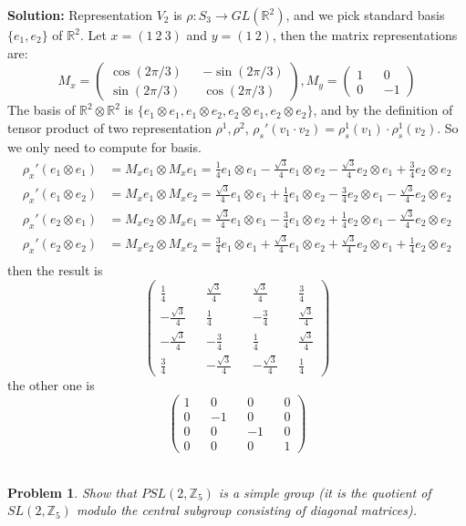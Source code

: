 \documentclass[12pt]{article}
\newtheorem{problem}{Problem}
\begin{document}
\textbf{Solution:} Representation $V_2$ is $\rho:S_3\to GL(\mathbb{R}^2)$, and we pick standard basis $\{e_1, e_2\}$ of $\mathbb{R}^2$. Let $x=(1\ 2\ 3)$ and $y=(1\ 2)$, then the matrix representations are:
$$
M_x=\begin{pmatrix}
\cos(2\pi/3) && -\sin(2\pi/3) \\ \sin(2\pi/3) && \cos(2\pi/3)
\end{pmatrix}, M_y=
\begin{pmatrix}
1 && 0 \\
0 && -1
\end{pmatrix}
$$
The basis of $\mathbb{R}^2\otimes\mathbb{R}^2$ is $\{e_1\otimes e_1, e_1\otimes e_2, e_2\otimes e_1, e_2\otimes e_2\}$, and by the definition of tensor product of two representation $\rho^1,\rho^2$, $\rho_s'(v_1\cdot v_2)=\rho^1_s(v_1)\cdot\rho^1_s(v_2)$. So we only need to compute for basis.
$$
\begin{aligned}
\rho_x'(e_1\otimes e_1)&=M_xe_1\otimes M_xe_1= \frac{1}{4}e_1\otimes e_1-\frac{\sqrt{3}}{4}e_1\otimes e_2-\frac{\sqrt{3}}{4}e_2\otimes e_1+\frac{3}{4}e_2\otimes e_2\\
\rho_x'(e_1\otimes e_2)&=M_xe_1\otimes M_xe_2=\frac{\sqrt{3}}{4}e_1\otimes e_1+\frac{1}{4}e_1\otimes e_2-\frac{3}{4}e_2\otimes e_1-\frac{\sqrt{3}}{4}e_2\otimes e_2 \\
\rho_x'(e_2\otimes e_1)&=M_xe_2\otimes M_xe_1=\frac{\sqrt{3}}{4}e_1\otimes e_1-\frac{3}{4}e_1\otimes e_2+\frac{1}{4}e_2\otimes e_1-\frac{\sqrt{3}}{4}e_2\otimes e_2 \\
\rho_x'(e_2\otimes e_2)&=M_xe_2\otimes M_xe_2= \frac{3}{4}e_1\otimes e_1+\frac{\sqrt{3}}{4}e_1\otimes e_2+\frac{\sqrt{3}}{4}e_2\otimes e_1+\frac{1}{4}e_2\otimes e_2\\
\end{aligned}
$$
then the result is 
$$
\begin{pmatrix}
\frac{1}{4} && \frac{\sqrt{3}}{4} && \frac{\sqrt{3}}{4} && \frac{3}{4}\\
-\frac{\sqrt{3}}{4} && \frac{1}{4} && -\frac{3}{4} && \frac{\sqrt{3}}{4}\\
-\frac{\sqrt{3}}{4} && -\frac{3}{4} && \frac{1}{4} && \frac{\sqrt{3}}{4} \\
\frac{3}{4} && -\frac{\sqrt{3}}{4} && -\frac{\sqrt{3}}{4} && \frac{1}{4} 
\end{pmatrix}
$$
the other one is 
$$
\begin{pmatrix}
1 && 0 && 0 && 0 \\
0 && -1 && 0 && 0 \\
0 && 0 && -1 && 0 \\
0 && 0 && 0 && 1
\end{pmatrix}
$$
\\ 
\begin{problem}
Show that $PSL(2,\mathbb{Z}_5)$ is a simple group (it is the quotient of $SL(2,\mathbb{Z}_5)$ modulo the central subgroup consisting of diagonal matrices).
\end{problem}
\end{document}
